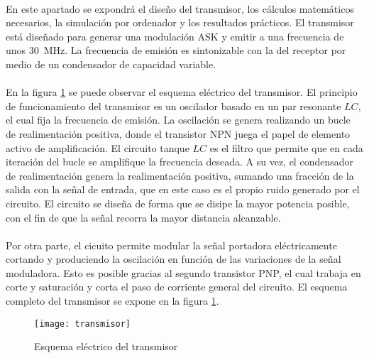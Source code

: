 \paragraph{}
En este apartado se expondr\'a el diseño del transmisor, los c\'alculos matem\'aticos necesarios, la simulaci\'on por ordenador y los resultados pr\'acticos.
El transmisor está diseñado para generar una modulación ASK y emitir a una frecuencia de unos \SI{30}{\mega\hertz}. La frecuencia de emisión es sintonizable con la del receptor por medio de un condensador de capacidad variable.
\paragraph{}
En la figura \ref{fig:tx} se puede observar el esquema eléctrico del transmisor.
El principio de funcionamiento del transmisor es un oscilador basado en un par resonante $LC$, el cual fija la frecuencia de emisión. 
La oscilaci\'on se genera realizando un bucle de realimentación positiva, donde el transistor NPN juega el papel de elemento activo de amplificación. 
El circuito tanque $LC$ es el filtro que permite que en cada iteración del bucle se amplifique la frecuencia deseada. A su vez, el condensador de realimentación genera la realimentación positiva, sumando una fracción de la salida con la señal de entrada, que en este caso es el propio ruido generado por el circuito.
El circuito se diseña de forma que se disipe la mayor potencia posible, con el fin de que la señal recorra la mayor distancia alcanzable. 
\paragraph{}
Por otra parte, el cicuito permite modular la señal portadora eléctricamente cortando y produciendo la oscilación en función de las variaciones de la señal moduladora. Esto es posible gracias al segundo transistor PNP, el cual trabaja en corte y saturaci\'on y corta el paso de corriente general del circuito.
El esquema completo del transmisor se expone en la figura \ref{fig:tx}.

\begin{figure}[h]
    \centering
    \texttt{[image: transmisor]}
    \caption{Esquema el\'ectrico del transmisor}
    \label{fig:tx}
\end{figure}

